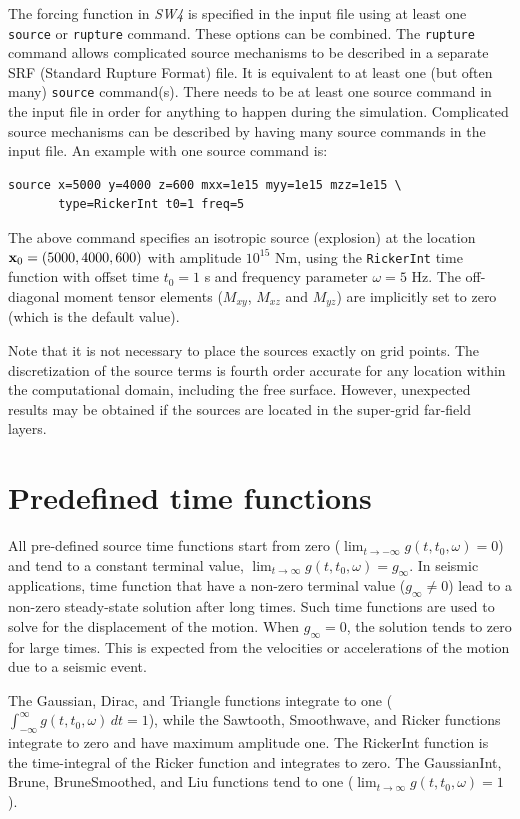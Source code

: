 \documentclass[11pt]{report}
\begin{document}
The forcing function in \emph{SW4} is specified in the input file using at least one {\tt source} or
{\tt rupture} command. These options can be combined. The {\tt rupture} command allows complicated
source mechanisms to be described in a separate SRF (Standard Rupture Format) file. It is equivalent
to at least one (but often many) {\tt source} command(s). There needs to be at least one source
command in the input file in order for anything to happen during the simulation. Complicated source
mechanisms can be described by having many source commands in the input file. An example with one
source command is:
\begin{verbatim}
source x=5000 y=4000 z=600 mxx=1e15 myy=1e15 mzz=1e15 \
       type=RickerInt t0=1 freq=5
\end{verbatim}
The above command specifies an isotropic source (explosion) at the location ${\bf
  x}_0=(5000,4000,600)$ with amplitude $10^{15}$ Nm, using the {\tt RickerInt} time function with
offset time $t_0=1$ s and frequency parameter $\omega=5$ Hz. The off-diagonal moment tensor elements
($M_{xy}$, $M_{xz}$ and $M_{yz}$) are implicitly set to zero (which is the default value).

Note that it is not necessary to place the sources exactly on grid points. The discretization of the
source terms is fourth order accurate for any location within the computational domain, including
the free surface. However, unexpected results may be obtained if the sources are located in the
super-grid far-field layers.


\section{Predefined time functions}\label{sec:predefined}

All pre-defined source time functions start from zero ($\lim_{t\to -\infty} g(t,t_0,\omega) = 0$)
and tend to a constant terminal value, $\lim_{t\to \infty} g(t,t_0,\omega) = g_\infty$. In seismic
applications, time function that have a non-zero terminal value ($g_\infty\ne 0$) lead to a non-zero
steady-state solution after long times. Such time functions are used to solve for the displacement
of the motion. When $g_\infty = 0$, the solution tends to zero for large times. This is
expected from the velocities or accelerations of the motion due to a seismic event.

The Gaussian, Dirac, and Triangle functions integrate to one ($\int_{-\infty}^{\infty}
g(t,t_0,\omega) \, dt = 1$), while the Sawtooth, Smoothwave, and Ricker functions integrate to zero
and have maximum amplitude one. The RickerInt function is the time-integral of the Ricker function
and integrates to zero. The GaussianInt, Brune, BruneSmoothed, and Liu functions tend to one
($\lim_{t\to\infty} g(t,t_0,\omega) = 1$).
\end{document}
